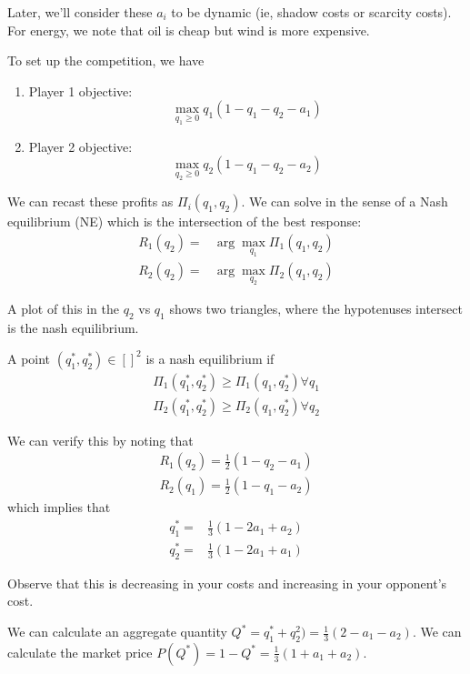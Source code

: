 Later, we'll consider these $a_i$ to be dynamic (ie, shadow costs or scarcity costs). For energy, we note that oil is cheap but wind is more expensive.

To set up the competition, we have
\begin{enumerate}
	\item Player 1 objective:
	\begin{equation}
		\max_{q_1\geq 0} q_1 (1-q_1 - q_2 - a_1) 
	\end{equation} 
	\item Player 2 objective:
	\begin{equation}
		\max_{q_2\geq 0} q_2 (1-q_1 - q_2 - a_2) 
	\end{equation}
\end{enumerate}
We can recast these profits as $\Pi_i(q_1,q_2)$. We can solve in the sense of a Nash equilibrium (NE) which is the intersection of the best response:
\begin{align}
	R_1(q_2) =& \arg\max_{q_1} \Pi_1(q_1,q_2)\\
	R_2(q_2) =& \arg\max_{q_2} \Pi_2(q_1,q_2)
\end{align}

A plot of this in the $q_2$ vs $q_1$ shows two triangles, where the hypotenuses intersect is the nash equilibrium.

\begin{definition}\label{def:nash_equil}
	A point $(q_1^*, q_2^*) \in \left[ \right]^2$ is a nash equilibrium if
	\begin{align}
		\Pi_1(q^*_1, q^*_2) \geq \Pi_1(q_1, q_2^*) \forall q_1\\
		\Pi_2(q^*_1, q^*_2) \geq \Pi_2(q_1, q_2^*) \forall q_2
	\end{align}
\end{definition}
We can verify this by noting that
\begin{align}
	R_1(q_2) = \frac12 (1-q_2-a_1)\\
	R_2(q_1) = \frac12 (1-q_1-a_2)
\end{align}
which implies that
\begin{align}
	q_1^* =& \frac{1}{3} (1-2a_1 + a_2) \\
	q_2^* =& \frac{1}{3} (1-2a_1 + a_1) 
\end{align}

Observe that this is decreasing in your costs and increasing in your opponent's cost.

We can calculate an aggregate quantity $Q^*=q_1^* + q_2^2) = \frac13 (2-a_1-a_2)$. We can calculate the market price $P(Q^*) = 1-Q^*=\frac13 (1+a_1 + a_2)$.

